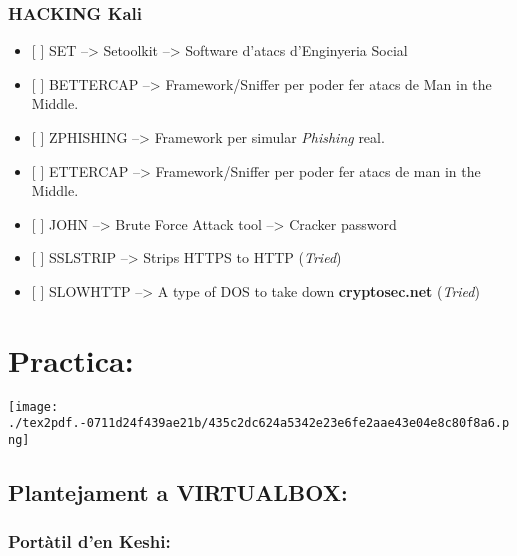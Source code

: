 \documentclass[]{article}
\providecommand{\tightlist}{%
  \setlength{\itemsep}{0pt}\setlength{\parskip}{0pt}}
\begin{document}
\hypertarget{hacking-kali}{%
\subsubsection{\texorpdfstring{\textbf{HACKING
Kali}}{HACKING Kali}}\label{hacking-kali}}

\begin{itemize}
\tightlist
\item
  {[} {]} SET --\textgreater{} Setoolkit --\textgreater{} Software
  d'atacs d'Enginyeria Social
\item
  {[} {]} BETTERCAP --\textgreater{} Framework/Sniffer per poder fer
  atacs de Man in the Middle.
\item
  {[} {]} ZPHISHING --\textgreater{} Framework per simular
  \emph{Phishing} real.
\item
  {[} {]} ETTERCAP --\textgreater{} Framework/Sniffer per poder fer
  atacs de man in the Middle.
\item
  {[} {]} JOHN --\textgreater{} Brute Force Attack tool --\textgreater{}
  Cracker password
\item
  {[} {]} SSLSTRIP --\textgreater{} Strips HTTPS to HTTP (\emph{Tried})
\item
  {[} {]} SLOWHTTP --\textgreater{} A type of DOS to take down
  \textbf{cryptosec.net} (\emph{Tried})
\end{itemize}

\hypertarget{practica}{%
\section{\texorpdfstring{\textbf{Practica:}}{Practica:}}\label{practica}}

\texttt{[image: ./tex2pdf.-0711d24f439ae21b/435c2dc624a5342e23e6fe2aae43e04e8c80f8a6.png]}

\hypertarget{plantejament-a-virtualbox}{%
\subsection{\texorpdfstring{\textbf{Plantejament a
VIRTUALBOX}:}{Plantejament a VIRTUALBOX:}}\label{plantejament-a-virtualbox}}

\hypertarget{portuxe0til-den-keshi}{%
\subsubsection{\texorpdfstring{\textbf{Portàtil d'en
Keshi}:}{Portàtil d'en Keshi:}}\label{portuxe0til-den-keshi}}
\end{document}
